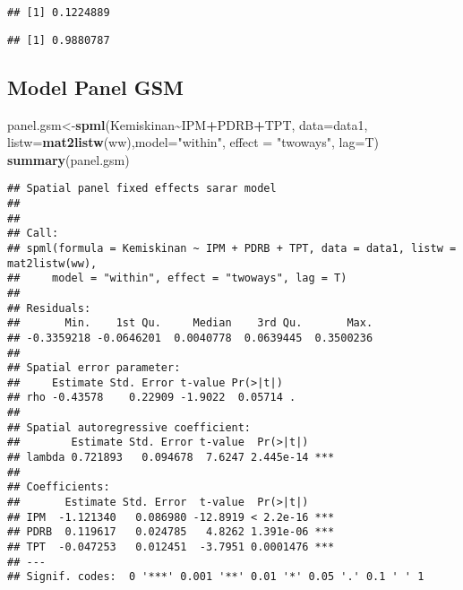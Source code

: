 \documentclass[
]{book}
\newenvironment{Shaded}{\begin{snugshade}}{\end{snugshade}}
\newcommand{\CommentTok}[1]{\textcolor[rgb]{0.56,0.35,0.01}{\textit{#1}}}
\newcommand{\DataTypeTok}[1]{\textcolor[rgb]{0.13,0.29,0.53}{#1}}
\newcommand{\DecValTok}[1]{\textcolor[rgb]{0.00,0.00,0.81}{#1}}
\newcommand{\KeywordTok}[1]{\textcolor[rgb]{0.13,0.29,0.53}{\textbf{#1}}}
\newcommand{\NormalTok}[1]{#1}
\newcommand{\OperatorTok}[1]{\textcolor[rgb]{0.81,0.36,0.00}{\textbf{#1}}}
\newcommand{\StringTok}[1]{\textcolor[rgb]{0.31,0.60,0.02}{#1}}
\begin{document}
\begin{Shaded}
\end{Shaded}

\begin{verbatim}
## [1] 0.1224889
\end{verbatim}

\begin{Shaded}
\end{Shaded}

\begin{verbatim}
## [1] 0.9880787
\end{verbatim}

\hypertarget{model-panel-gsm}{%
\subsection{Model Panel GSM}\label{model-panel-gsm}}

\begin{Shaded}
\begin{Highlighting}[]
\NormalTok{panel.gsm\textless{}{-}}\KeywordTok{spml}\NormalTok{(Kemiskinan}\OperatorTok{\textasciitilde{}}\NormalTok{IPM}\OperatorTok{+}\NormalTok{PDRB}\OperatorTok{+}\NormalTok{TPT, }\DataTypeTok{data=}\NormalTok{data1, }\DataTypeTok{listw=}\KeywordTok{mat2listw}\NormalTok{(ww),}\DataTypeTok{model=}\StringTok{"within"}\NormalTok{, }
                \DataTypeTok{effect =} \StringTok{"twoways"}\NormalTok{, }\DataTypeTok{lag=}\NormalTok{T)}
\KeywordTok{summary}\NormalTok{(panel.gsm)}
\end{Highlighting}
\end{Shaded}

\begin{verbatim}
## Spatial panel fixed effects sarar model
##  
## 
## Call:
## spml(formula = Kemiskinan ~ IPM + PDRB + TPT, data = data1, listw = mat2listw(ww), 
##     model = "within", effect = "twoways", lag = T)
## 
## Residuals:
##       Min.    1st Qu.     Median    3rd Qu.       Max. 
## -0.3359218 -0.0646201  0.0040778  0.0639445  0.3500236 
## 
## Spatial error parameter:
##     Estimate Std. Error t-value Pr(>|t|)  
## rho -0.43578    0.22909 -1.9022  0.05714 .
## 
## Spatial autoregressive coefficient:
##        Estimate Std. Error t-value  Pr(>|t|)    
## lambda 0.721893   0.094678  7.6247 2.445e-14 ***
## 
## Coefficients:
##       Estimate Std. Error  t-value  Pr(>|t|)    
## IPM  -1.121340   0.086980 -12.8919 < 2.2e-16 ***
## PDRB  0.119617   0.024785   4.8262 1.391e-06 ***
## TPT  -0.047253   0.012451  -3.7951 0.0001476 ***
## ---
## Signif. codes:  0 '***' 0.001 '**' 0.01 '*' 0.05 '.' 0.1 ' ' 1
\end{verbatim}
\end{document}
